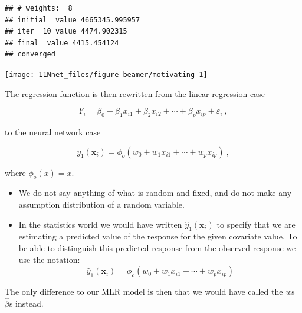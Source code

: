 \documentclass[10pt,ignorenonframetext,]{beamer}
\begin{document}
\begin{frame}[fragile]

\scriptsize

\begin{verbatim}
## # weights:  8
## initial  value 4665345.995957 
## iter  10 value 4474.902315
## final  value 4415.454124 
## converged
\end{verbatim}

\begin{center}\texttt{[image: 11Nnet\_files/figure-beamer/motivating-1]} \end{center}

\end{frame}

\begin{frame}

The regression function is then rewritten from the linear regression
case

\begin{equation*}
 Y_i=\beta_0 + \beta_1 x_{i1}+\beta_2 x_{i2}+\cdots + \beta_p x_{ip}+\varepsilon_i \ ,
\end{equation*}

to the neural network case

\begin{equation*}
y_1({\boldsymbol x}_i)=\phi_o(w_0+w_1 x_{i1}+\cdots + w_p x_{ip}) \ ,
\end{equation*}

where \(\phi_o(x)=x\).

\end{frame}

\begin{frame}

\begin{itemize}
\item
  We do not say anything of what is random and fixed, and do not make
  any assumption distribution of a random variable.
\item
  In the statistics world we would have written
  \(\hat{y}_1({\boldsymbol x}_i)\) to specify that we are estimating a
  predicted value of the response for the given covariate value. To be
  able to distinguish this predicted response from the observed response
  we use the notation:
  \[ \hat{y}_1({\boldsymbol x}_i)=\phi_o(w_0+w_1 x_{i1}+\cdots + w_p x_{ip})\]
\end{itemize}

The only difference to our MLR model is then that we would have called
the \(w\)s \(\hat{\beta}\)s instead.

\end{frame}
\end{document}
